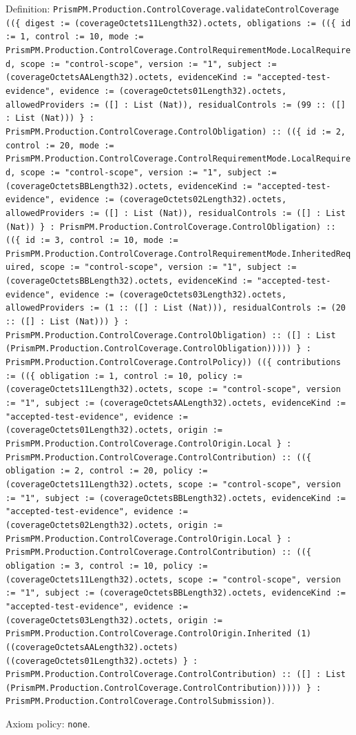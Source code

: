 \documentclass[11pt]{article}
\begin{document}
\noindent Definition: \texttt{PrismPM.Production.ControlCoverage.validateControlCoverage ((\{ digest := (coverageOctets11Length32).octets, obligations := ((\{ id := 1, control := 10, mode := PrismPM.Production.ControlCoverage.ControlRequirementMode.LocalRequired, scope := "control-scope", version := "1", subject := (coverageOctetsAALength32).octets, evidenceKind := "accepted-test-evidence", evidence := (coverageOctets01Length32).octets, allowedProviders := ([] : List (Nat)), residualControls := (99 :: ([] : List (Nat))) \} : PrismPM.Production.ControlCoverage.ControlObligation) :: ((\{ id := 2, control := 20, mode := PrismPM.Production.ControlCoverage.ControlRequirementMode.LocalRequired, scope := "control-scope", version := "1", subject := (coverageOctetsBBLength32).octets, evidenceKind := "accepted-test-evidence", evidence := (coverageOctets02Length32).octets, allowedProviders := ([] : List (Nat)), residualControls := ([] : List (Nat)) \} : PrismPM.Production.ControlCoverage.ControlObligation) :: ((\{ id := 3, control := 10, mode := PrismPM.Production.ControlCoverage.ControlRequirementMode.InheritedRequired, scope := "control-scope", version := "1", subject := (coverageOctetsBBLength32).octets, evidenceKind := "accepted-test-evidence", evidence := (coverageOctets03Length32).octets, allowedProviders := (1 :: ([] : List (Nat))), residualControls := (20 :: ([] : List (Nat))) \} : PrismPM.Production.ControlCoverage.ControlObligation) :: ([] : List (PrismPM.Production.ControlCoverage.ControlObligation))))) \} : PrismPM.Production.ControlCoverage.ControlPolicy)) ((\{ contributions := ((\{ obligation := 1, control := 10, policy := (coverageOctets11Length32).octets, scope := "control-scope", version := "1", subject := (coverageOctetsAALength32).octets, evidenceKind := "accepted-test-evidence", evidence := (coverageOctets01Length32).octets, origin := PrismPM.Production.ControlCoverage.ControlOrigin.Local \} : PrismPM.Production.ControlCoverage.ControlContribution) :: ((\{ obligation := 2, control := 20, policy := (coverageOctets11Length32).octets, scope := "control-scope", version := "1", subject := (coverageOctetsBBLength32).octets, evidenceKind := "accepted-test-evidence", evidence := (coverageOctets02Length32).octets, origin := PrismPM.Production.ControlCoverage.ControlOrigin.Local \} : PrismPM.Production.ControlCoverage.ControlContribution) :: ((\{ obligation := 3, control := 10, policy := (coverageOctets11Length32).octets, scope := "control-scope", version := "1", subject := (coverageOctetsBBLength32).octets, evidenceKind := "accepted-test-evidence", evidence := (coverageOctets03Length32).octets, origin := PrismPM.Production.ControlCoverage.ControlOrigin.Inherited (1) ((coverageOctetsAALength32).octets) ((coverageOctets01Length32).octets) \} : PrismPM.Production.ControlCoverage.ControlContribution) :: ([] : List (PrismPM.Production.ControlCoverage.ControlContribution))))) \} : PrismPM.Production.ControlCoverage.ControlSubmission))}.\par
\noindent Axiom policy: \texttt{none}.\par
\end{document}

